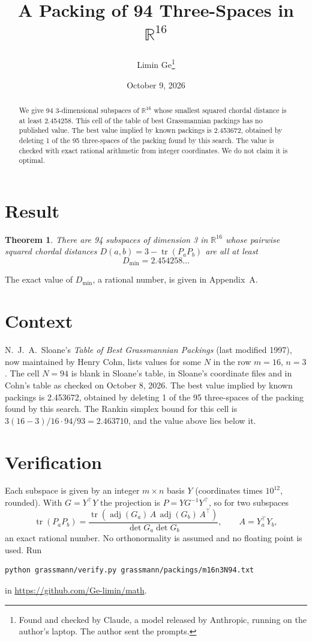 \documentclass[11pt,a4paper]{article}
\title{A Packing of 94 Three-Spaces in $\mathbb{R}^{16}$}
\author{Limin Ge\thanks{Found and checked by Claude, a model released by Anthropic, running on the author's laptop. The author sent the prompts.}}
\date{October 9, 2026}
\newtheorem*{theorem}{Theorem}
\begin{document}
\maketitle
\begin{abstract}
We give 94 3-dimensional subspaces of $\mathbb{R}^{16}$ whose smallest squared chordal distance is at least 2.454258. This cell of the table of best Grassmannian packings has no published value. The best value implied by known packings is 2.453672, obtained by deleting 1 of the 95 three-spaces of the packing found by this search. The value is checked with exact rational arithmetic from integer coordinates. We do not claim it is optimal.
\end{abstract}

\section{Result}
\begin{theorem}
There are 94 subspaces of dimension 3 in $\mathbb{R}^{16}$ whose pairwise squared chordal distances $D(a,b) = 3 - \operatorname{tr}(P_aP_b)$ are all at least
\[ D_{\min} = 2.454258\ldots \]
\end{theorem}
The exact value of $D_{\min}$, a rational number, is given in Appendix~A.


\section{Context}
N.~J.~A.~Sloane's \emph{Table of Best Grassmannian Packings} (last modified 1997), now maintained by Henry Cohn, lists values for some $N$ in the row $m=16$, $n=3$. The cell $N=94$ is blank in Sloane's table, in Sloane's coordinate files and in Cohn's table as checked on October 8, 2026. The best value implied by known packings is 2.453672, obtained by deleting 1 of the 95 three-spaces of the packing found by this search. The Rankin simplex bound for this cell is $3(16-3)/16\cdot 94/93 = 2.463710$, and the value above lies below it.


\section{Verification}
Each subspace is given by an integer $m\times n$ basis $Y$ (coordinates times $10^{12}$, rounded). With $G=Y^\top Y$ the projection is $P=YG^{-1}Y^\top$, so for two subspaces
\[ \operatorname{tr}(P_aP_b)=\frac{\operatorname{tr}(\operatorname{adj}(G_a)\,A\,\operatorname{adj}(G_b)\,A^\top)}{\det G_a\det G_b},\qquad A=Y_a^\top Y_b, \]
an exact rational number. No orthonormality is assumed and no floating point is used. Run
\begin{verbatim}
python grassmann/verify.py grassmann/packings/m16n3N94.txt
\end{verbatim}
in \url{https://github.com/Ge-limin/math}.
\end{document}

